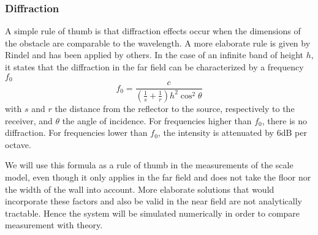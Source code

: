 \subsubsection{Diffraction}

A simple rule of thumb is that diffraction effects occur when the dimensions of the obstacle are comparable to the wavelength. A more elaborate rule is given by Rindel\cite{rindel-diffraction} and has been applied by others\cite{davy-diffraction, stage-acoustics}. In the case of an infinite band of height $h$, it states that the diffraction in the far field can be characterized by a frequency $f_0$
\begin{equation}
\label{diffractionEq}
f_0 = \frac{c}{
	\left(\frac{1}{s} + \frac{1}{r}\right) h^2 \cos^2 \theta}
\end{equation}
with $s$ and $r$ the distance from the reflector to the source, respectively to the receiver, and $\theta$ the angle of incidence. For frequencies higher than $f_0$, there is no diffraction. For frequencies lower than $f_0$, the intensity is attenuated by 6dB per octave. 

We will use this formula as a rule of thumb in the measurements of the scale model, even though it only applies in the far field and does not take the floor nor the width of the wall into account. More elaborate solutions that would incorporate these factors and also be valid in the near field are not analytically tractable. Hence the system will be simulated numerically in order to compare measurement with theory.


